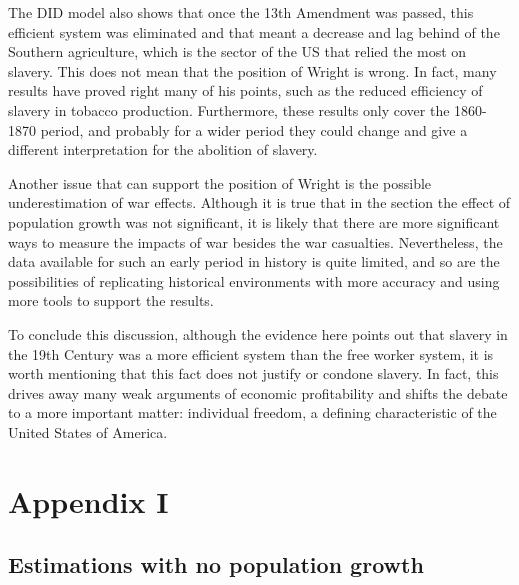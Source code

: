 \documentclass[12pt]{report}
\begin{document}
The DID model also shows that once the 13th Amendment was passed, this efficient system was eliminated and that meant a decrease and lag behind of the Southern agriculture, which is the sector of the US that relied the most on slavery. 
This does not mean that the position of Wright is wrong. In fact, many results have proved right many of his points, such as the reduced efficiency of slavery in tobacco production. Furthermore, these results only cover the 1860-1870 period, and probably for a wider period they could change and give a different interpretation for the abolition of slavery.

Another issue that can support the position of Wright is the possible underestimation of war effects. Although it is true that in the  section the effect of population growth was not significant, it is likely that there are more significant ways to measure the impacts of war besides the war casualties. Nevertheless, the data available for such an early period in history is quite limited, and so are the possibilities of replicating historical environments with more accuracy and using more tools to support the results.

To conclude this discussion, although the evidence here points out that slavery in the 19th Century was a more efficient system than the free worker system, it is worth mentioning that this fact does not justify or condone slavery. In fact, this drives away many weak arguments of economic profitability and shifts the debate to a more important matter: individual freedom, a defining characteristic of the United States of America.

\nocite{*} %

\clearpage
{}

\printbibliography



\chapter*{Appendix I}\label{sec:Appendix I}
\section*{Estimations with no population growth}
\end{document}
